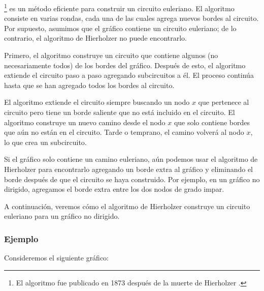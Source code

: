 \footnote{El algoritmo fue publicado
en 1873 después de la muerte de Hierholzer \cite{hie73}.} es un método eficiente
para construir
un circuito euleriano.
El algoritmo consiste en varias rondas,
cada una de las cuales agrega nuevos bordes al circuito.
Por supuesto, asumimos que el gráfico contiene
un circuito euleriano; de lo contrario, el algoritmo de Hierholzer
no puede encontrarlo.

Primero, el algoritmo construye un circuito que contiene
algunos (no necesariamente todos) de los bordes del gráfico.
Después de esto, el algoritmo extiende el circuito
paso a paso agregando subcircuitos a él.
El proceso continúa hasta que se han agregado todos los bordes
al circuito.

El algoritmo extiende el circuito siempre buscando
un nodo $x$ que pertenece al circuito pero tiene
un borde saliente que no está incluido en el circuito.
El algoritmo construye un nuevo camino desde el nodo $x$
que solo contiene bordes que aún no están en el circuito.
Tarde o temprano,
el camino volverá al nodo $x$,
lo que crea un subcircuito.

Si el gráfico solo contiene un camino euleriano,
aún podemos usar el algoritmo de Hierholzer
para encontrarlo agregando un borde extra al gráfico
y eliminando el borde después de que el circuito
se haya construido.
Por ejemplo, en un gráfico no dirigido,
agregamos el borde extra entre los dos
nodos de grado impar.

A continuación, veremos cómo el algoritmo de Hierholzer
construye un circuito euleriano para un gráfico no dirigido.

\subsubsection{Ejemplo}
\begin{samepage}
Consideremos el siguiente gráfico:
\begin{center}
\end{center}
\end{samepage}


